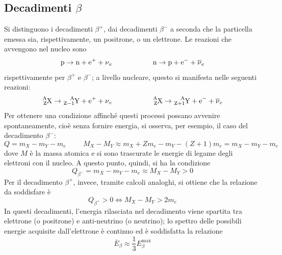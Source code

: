 \documentclass[11pt, a4paper]{scrartcl}
\theoremstyle{style}
\theoremstyle{style1}
\numberwithin{equation}{subsection}
\begin{document}
\subsection{Decadimenti $\beta $}

Si distinguono i decadimenti $\beta ^+$, dai decadimenti $\beta ^-$ a seconda che la particella emessa sia, rispettivamente, un positrone, o un elettrone.
Le reazioni che avvengono nel nucleo sono
\[
	\ce{p} \to  \ce{n + e+ + \nu_e} \hspace{2cm} \ce{n} \to \ce{p + e- + \overline{\nu }_e}
\] 
rispettivamente per $\beta ^+$ e $\beta ^-$; a livello nucleare, questo si manifesta nelle seguenti reazioni:
\[
	\ce{^A_ZX} \to  \ce{^A_{Z-1}Y + e+ + \nu _e} \hspace{2cm} \ce{^A_ZX}\to \ce{^A_{Z+1}Y + e- + \overline{\nu }_e}
\] 
Per ottenere una condizione affinch\'e questi processi possano avvenire spontaneamente, cio\`e senza fornire energia, si osserva, per esempio, il caso del decadimento $\beta ^-$:
\[
Q = m_X - m_Y - m_e \hspace{1cm} M_X - M_Y \approx m_X + Zm_e - m_Y - (Z+1)m_e = m_X - m_Y - m_e
\] 
dove $M$ \`e la massa atomica e si sono trascurate le energie di legame degli elettroni con il nucleo.
A questo punto, quindi, si ha la condizione 
\begin{equation}
	Q_{\beta ^-} = m_X - m_Y - m_e \approx M_X - M_Y > 0
\end{equation}
Per il decadimento $\beta ^+$, invece, tramite calcoli analoghi, si ottiene che la relazione da soddisfare \`e 
\begin{equation}
	Q_{\beta ^+} > 0 \iff M_X - M_Y > 2m_e
\end{equation}
In questi decadimenti, l'energia rilasciata nel decadimento viene spartita tra elettrone (o positrone) e anti-neutrino (o neutrino); lo spettro delle possibili energie acquisite dall'elettrone \`e continuo ed \`e soddisfatta la relazione 
\begin{equation}
	\overline{E}_\beta  \approx \frac{1}{3} E^\text{max}_\beta 
\end{equation}
\end{document}
